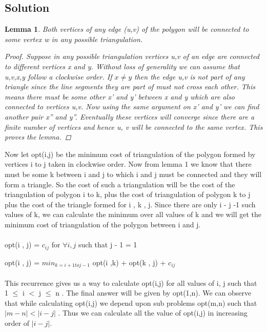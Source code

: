 \documentclass[12pt]{article}
\newtheorem{lemma}[theorem]{Lemma}
\begin{document}
\subsection{Solution}
\begin{lemma} Both vertices of any edge (u,v) of the polygon will be connected to some vertex w in any possible triangulation.
\begin{proof}
Suppose in any possible triangulation vertices u,v of an edge are connected to different vertices x and y. Without loss of generality we can assume that u,v,x,y follow a clockwise order. If $x \neq y$ then the edge u,v is not part of any triangle since the line segments they are part of must not cross each other. This means there must be some other x' and y' between x and y which are also connected to vertices u,v. Now using the same argument on x' and y' we can find another pair x'' and y''. Eventually these vertices will converge since there are a finite number of vertices and hence u, v will be connected to the same vertex. This proves the lemma.
\end{proof}
\end{lemma}

Now let opt(i,j) be the minimum cost of triangulation of the polygon formed by vertices i to j taken in clockwise order. Now from lemma 1 we know that there must be some k between i and j to which i and j must be connected and they will form a triangle. So the cost of such a triangulation will be the cost of the triangulation of polygon i to k, plus the cost of triangulation of polygon k to j plus the cost of the triangle formed for i , k , j. Since there are only i - j -1 such values of k, we can calculate the minimum over all values of k and we will get the minimum cost of triangulation of the polygon between i and j.
\\\\
opt(i , j) = $c_{ij}$ for $\forall i, j$ such that  j - 1 = 1

opt(i , j) =  $min_{k = i+1 to j-1}$ { opt(i ,k) + opt(k , j) + $c_{ij}$}
\\\\
This recurrence gives us a way to calculate opt(i,j) for all values of i, j such that 1 $\leq$ i $<$ j $\leq$ n . The final answer will be given by opt(1,n). We can observe that while calculating opt(i,j) we depend upon sub problems opt(m,n) such that $ | m - n | < | i - j| $ . Thus we can calculate all the value of opt(i,j) in increasing order of $| i - j|$.
\end{document}
